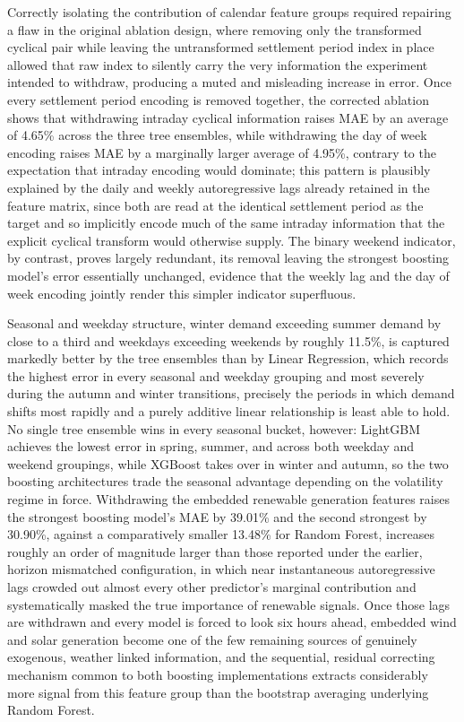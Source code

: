 \documentclass[runningheads]{llncs}
\begin{document}
Correctly isolating the contribution of calendar feature groups required repairing a flaw in the original ablation design, where removing only the transformed cyclical pair while leaving the untransformed settlement period index in place allowed that raw index to silently carry the very information the experiment intended to withdraw, producing a muted and misleading increase in error. Once every settlement period encoding is removed together, the corrected ablation shows that withdrawing intraday cyclical information raises MAE by an average of 4.65\% across the three tree ensembles, while withdrawing the day of week encoding raises MAE by a marginally larger average of 4.95\%, contrary to the expectation that intraday encoding would dominate; this pattern is plausibly explained by the daily and weekly autoregressive lags already retained in the feature matrix, since both are read at the identical settlement period as the target and so implicitly encode much of the same intraday information that the explicit cyclical transform would otherwise supply. The binary weekend indicator, by contrast, proves largely redundant, its removal leaving the strongest boosting model's error essentially unchanged, evidence that the weekly lag and the day of week encoding jointly render this simpler indicator superfluous.

Seasonal and weekday structure, winter demand exceeding summer demand by close to a third and weekdays exceeding weekends by roughly 11.5\%, is captured markedly better by the tree ensembles than by Linear Regression, which records the highest error in every seasonal and weekday grouping and most severely during the autumn and winter transitions, precisely the periods in which demand shifts most rapidly and a purely additive linear relationship is least able to hold. No single tree ensemble wins in every seasonal bucket, however: LightGBM achieves the lowest error in spring, summer, and across both weekday and weekend groupings, while XGBoost takes over in winter and autumn, so the two boosting architectures trade the seasonal advantage depending on the volatility regime in force. Withdrawing the embedded renewable generation features raises the strongest boosting model's MAE by 39.01\% and the second strongest by 30.90\%, against a comparatively smaller 13.48\% for Random Forest, increases roughly an order of magnitude larger than those reported under the earlier, horizon mismatched configuration, in which near instantaneous autoregressive lags crowded out almost every other predictor's marginal contribution and systematically masked the true importance of renewable signals. Once those lags are withdrawn and every model is forced to look six hours ahead, embedded wind and solar generation become one of the few remaining sources of genuinely exogenous, weather linked information, and the sequential, residual correcting mechanism common to both boosting implementations extracts considerably more signal from this feature group than the bootstrap averaging underlying Random Forest.
\end{document}
